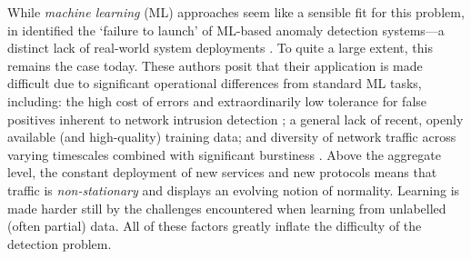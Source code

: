 \documentclass[10pt, times, conference, letterpaper]{IEEEtran}
\begin{document}
While \emph{machine learning} (ML) approaches seem like a sensible fit for this problem, in \citeyear{DBLP:conf/sp/SommerP10} \citeauthor{DBLP:conf/sp/SommerP10} identified the `failure to launch' of ML-based anomaly detection systems---a distinct lack of real-world system deployments \cite{DBLP:conf/sp/SommerP10}.
To quite a large extent, this remains the case today.
These authors posit that their application is made difficult due to significant operational differences from standard ML tasks, including: the high cost of errors and extraordinarily low tolerance for false positives inherent to network intrusion detection \cite{DBLP:conf/ccs/Axelsson99}; a general lack of recent, openly available (and high-quality) training data; and diversity of network traffic across varying timescales combined with significant burstiness \cite{DBLP:journals/ccr/LelandWTW95}.
Above the aggregate level, the constant deployment of new services and new protocols means that traffic is \emph{non-stationary} and displays an evolving notion of normality.
Learning is made harder still by the challenges encountered when learning from unlabelled (often partial) data.
All of these factors greatly inflate the difficulty of the detection problem.

\end{document}
